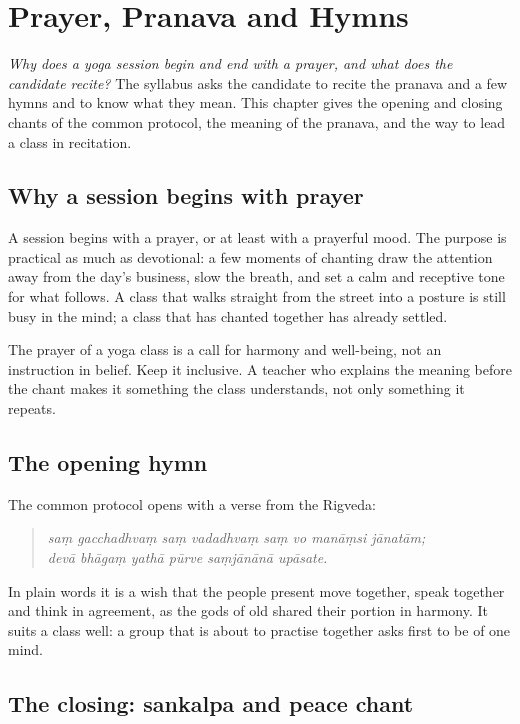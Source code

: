 \chapter{Prayer, Pranava and Hymns}
\label{ch:prayer}

\emph{Why does a yoga session begin and end with a prayer, and what does the candidate recite?}
The syllabus asks the candidate to recite the pranava and a few hymns and to know what they mean. This chapter gives the opening and closing chants of the common protocol, the meaning of the pranava, and the way to lead a class in recitation.

\section{Why a session begins with prayer}

A session begins with a prayer, or at least with a prayerful mood. The purpose is practical as much as devotional: a few moments of chanting draw the attention away from the day's business, slow the breath, and set a calm and receptive tone for what follows. A class that walks straight from the street into a posture is still busy in the mind; a class that has chanted together has already settled.

The prayer of a yoga class is a call for harmony and well-being, not an instruction in belief. Keep it inclusive. A teacher who explains the meaning before the chant makes it something the class understands, not only something it repeats.

\section{The opening hymn}

The common protocol opens with a verse from the Rigveda:

\begin{quote}
\emph{saṃ gacchadhvaṃ saṃ vadadhvaṃ saṃ vo manāṃsi jānatām;\\
devā bhāgaṃ yathā pūrve saṃjānānā upāsate.}
\end{quote}

In plain words it is a wish that the people present move together, speak together and think in agreement, as the gods of old shared their portion in harmony. It suits a class well: a group that is about to practise together asks first to be of one mind.

\section{The closing: sankalpa and peace chant}

